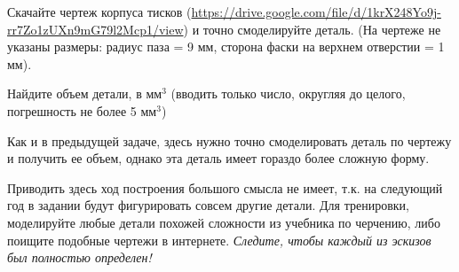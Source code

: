 
Скачайте чертеж корпуса тисков (\url{https://drive.google.com/file/d/1krX248Yo9j-rr7Zo1zUXn9mG79l2Mcp1/view}) и точно смоделируйте деталь.  
(На чертеже не указаны размеры:  радиус паза = 9 мм, 
сторона фаски на верхнем отверстии = 1 мм).


Найдите объем детали, в мм$^3$ (вводить только число, округляя до целого, погрешность не более 5 мм$^3$)

\explanationSection

Как и в предыдущей задаче, здесь нужно точно смоделировать деталь по чертежу и получить ее объем, однако эта деталь имеет гораздо более сложную форму. 

Приводить здесь ход построения большого смысла не имеет, т.к. на следующий год в задании будут фигурировать совсем другие детали.  Для тренировки, моделируйте любые детали похожей сложности из учебника по черчению, либо поищите подобные чертежи в интернете. \textit{Следите, чтобы каждый из эскизов был полностью определен!}

